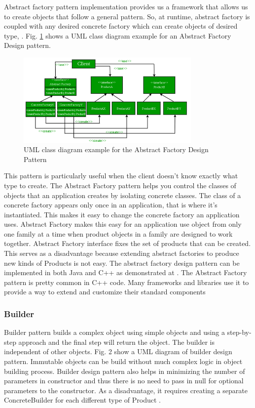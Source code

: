 \documentclass[sigplan,12pt,nonacm=true,review=false]{acmart}
\begin{document}
Abstract factory pattern implementation provides us a framework that allows us to create objects that follow a general pattern. So, at runtime, abstract factory is coupled with any desired concrete factory which can create objects of desired type, \cite{noauthor_abstract_nodate-1}. Fig. \ref{fig:uml1} shows a UML class diagram example for an Abstract Factory Design pattern.

\begin{figure}[tb]
  \includegraphics[width=0.8\textwidth]{eolang/tr-02/assets/Picture1.png}
  \caption{UML class diagram example for the Abstract Factory Design Pattern}
  \label{fig:uml1}
\end{figure}

This pattern is particularly useful when the client doesn’t know exactly what type to create. The Abstract Factory pattern helps you control the classes of objects that an application creates by isolating concrete classes. The class of a concrete factory appears only once in an application, that is where it’s instantiated. This makes it easy to change the concrete factory an application uses. Abstract Factory makes this easy for an application use object from only one family at a time when product objects in a family are designed to work together. 
Abstract Factory interface fixes the set of products that can be created. This serves as a disadvantage because extending abstract factories to produce new kinds of Products is not easy. 
The abstract factory design pattern can be implemented in both Java and C++ as demonstrated at \cite{noauthor_abstract_2017, noauthor_abstract_nodate}. The Abstract Factory pattern is pretty common in C++ code. Many frameworks and libraries use it to provide a way to extend and customize their standard components



\subsubsection{Builder}
Builder pattern builds a complex object using simple objects and using a step-by-step approach and the final step will return the object. The builder is independent of other objects. Fig. 2 show a UML diagram of builder design pattern. Immutable objects can be build without much complex logic in object building process. Builder design pattern also helps in minimizing the number of parameters in constructor and thus there is no need to pass in null for optional parameters to the constructor. As a disadvantage, it requires creating a separate ConcreteBuilder for each different type of Product \cite{noauthor_design_nodate-4, noauthor_builder_2017}.
\end{document}
